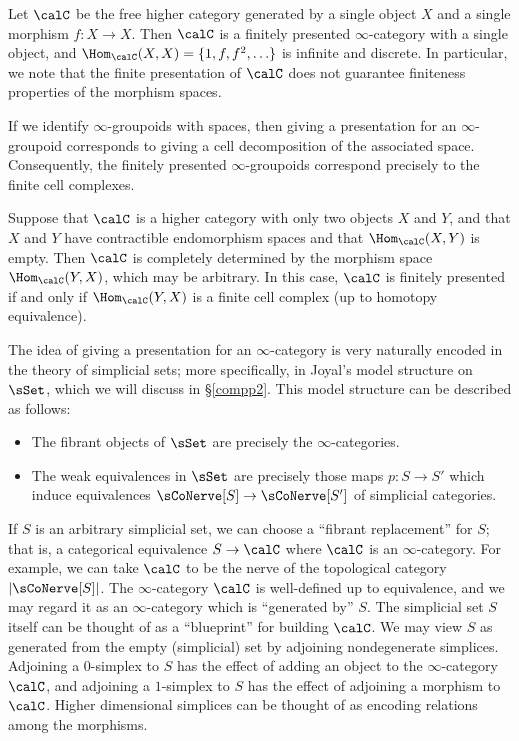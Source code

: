 \begin{example}\label{infinitemorphisms}
Let $\calC$ be the free higher category generated by a single
object $X$ and a single morphism $f: X \rightarrow X$. Then
$\calC$ is a finitely presented $\infty$-category with a single
object, and $\Hom_{\calC}(X,X) = \{ 1, f, f^2, \ldots \}$ is
infinite and discrete. In particular, we note that the finite
presentation of $\calC$ does not guarantee finiteness properties
of the morphism spaces.
\end{example}

\begin{example}
If we identify $\infty$-groupoids with spaces, then giving a
presentation for an $\infty$-groupoid corresponds to giving a cell
decomposition of the associated space. Consequently, the finitely
presented $\infty$-groupoids correspond precisely to the finite
cell complexes.
\end{example}

\begin{example}
Suppose that $\calC$ is a higher category with only two objects
$X$ and $Y$, and that $X$ and $Y$ have contractible endomorphism
spaces and that $\Hom_{\calC}(X,Y)$ is empty. Then $\calC$ is
completely determined by the morphism space $\Hom_{\calC}(Y,X)$,
which may be arbitrary. In this case, $\calC$ is finitely
presented if and only if $\Hom_{\calC}(Y,X)$ is a finite cell
complex (up to homotopy equivalence).
\end{example}

The idea of giving a presentation for an $\infty$-category is very
naturally encoded in the theory of simplicial sets; more
specifically, in Joyal's model structure on $\sSet$, which we will discuss in
\S \ref{compp2}. This model structure can be described as follows:

\begin{itemize}
\item The fibrant objects of $\sSet$ are precisely the
$\infty$-categories.

\item The weak equivalences in $\sSet$ are precisely those maps
$p: S \rightarrow S'$ which induce equivalences $\sCoNerve[S] \rightarrow \sCoNerve[S']$
of simplicial categories.
\end{itemize}

If $S$ is an arbitrary simplicial set, we can
choose a ``fibrant replacement'' for $S$; that is, a categorical
equivalence $S \rightarrow \calC$ where $\calC$ is an $\infty$-category. 
For example, we can take $\calC$ to be the nerve of the topological
category $| \sCoNerve[S] |$. 
The $\infty$-category $\calC$ is
well-defined up to equivalence, and we may
regard it as an $\infty$-category which is ``generated by'' $S$. The simplicial set $S$ itself can be thought of as a ``blueprint'' for building $\calC$. We may view $S$ as generated from the empty (simplicial) set by adjoining nondegenerate simplices. Adjoining a $0$-simplex to $S$ has the effect of adding an object to the $\infty$-category $\calC$, and adjoining a $1$-simplex to $S$ has the effect of adjoining a morphism to $\calC$. Higher dimensional simplices can be thought of as encoding relations among the morphisms.

